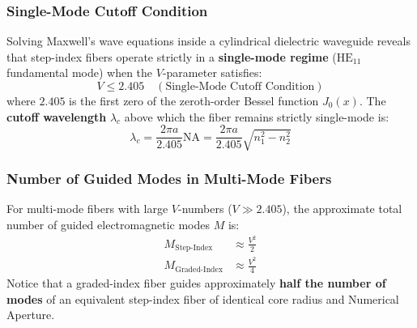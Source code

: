 \subsubsection{Single-Mode Cutoff Condition}
Solving Maxwell's wave equations inside a cylindrical dielectric waveguide reveals that step-index fibers operate strictly in a \textbf{single-mode regime} ($\text{HE}_{11}$ fundamental mode) when the $V$-parameter satisfies:
\begin{equation}
    V \le 2.405 \quad (\text{Single-Mode Cutoff Condition})
\end{equation}
where $2.405$ is the first zero of the zeroth-order Bessel function $J_0(x)$. The \textbf{cutoff wavelength} $\lambda_c$ above which the fiber remains strictly single-mode is:
\begin{equation}
    \lambda_c = \frac{2\pi a}{2.405}\text{NA} = \frac{2\pi a}{2.405}\sqrt{n_1^2 - n_2^2}
\end{equation}

\subsubsection{Number of Guided Modes in Multi-Mode Fibers}
For multi-mode fibers with large $V$-numbers ($V \gg 2.405$), the approximate total number of guided electromagnetic modes $M$ is:
\begin{align}
    M_{\text{Step-Index}} &\approx \frac{V^2}{2} \\
    M_{\text{Graded-Index}} &\approx \frac{V^2}{4}
\end{align}
Notice that a graded-index fiber guides approximately \textbf{half the number of modes} of an equivalent step-index fiber of identical core radius and Numerical Aperture.

